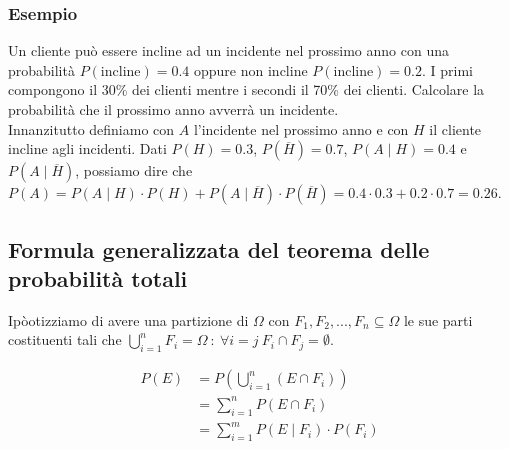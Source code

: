 \documentclass[11pt]{report}
\begin{document}
\subsubsection{Esempio}
Un cliente può essere incline ad un incidente nel prossimo anno con una probabilità $P(\text{incline}) = 0.4$ oppure non incline $P(\text{incline}) = 0.2$. I primi compongono il 30\% dei clienti mentre i secondi il 70\% dei clienti. Calcolare la probabilità che il prossimo anno avverrà un incidente.\\
Innanzitutto definiamo con $A$ l'incidente nel prossimo anno e con $H$ il cliente incline agli incidenti. Dati $P(H) = 0.3$, $P(\overline{H}) = 0.7$, $P(A \mid H) = 0.4$ e $P(A \mid \overline{H})$, possiamo dire che $P(A) = P(A \mid H) \cdot P(H) + P(A \mid \overline{H}) \cdot P(\overline{H}) = 0.4 \cdot 0.3 + 0.2 \cdot 0.7 = 0.26$.
\subsection{Formula generalizzata del teorema delle probabilità totali}
Ipòotizziamo di avere una partizione di $\Omega$ con $F_1, F_2,..., F_n \subseteq \Omega$ le sue parti costituenti tali che $\bigcup_{i=1}^{n}F_i = \Omega\ :\ \forall i=j\ F_i \cap F_j = \emptyset$.
\begin{center}
\end{center}
\begin{equation}
    \begin{split}
        P(E) & = P\left(\bigcup_{i=1}^{n}(E \cap F_i)\right)\\
        & = \sum_{i=1}^{n}P(E \cap F_i)\\
        & = \sum_{i=1}^{m}P(E \mid F_i) \cdot P(F_i)
    \end{split}
\end{equation}
\end{document}
